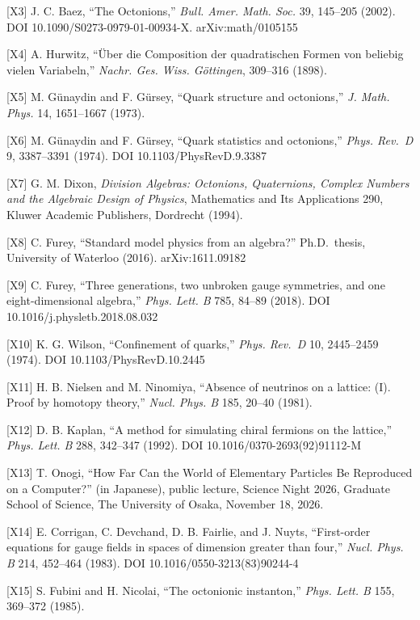 \documentclass[
  a4paper,
]{article}
\begin{document}
{[}X3{]} J. C. Baez, ``The Octonions,'' \emph{Bull. Amer. Math. Soc.}
39, 145--205 (2002). DOI 10.1090/S0273-0979-01-00934-X.
arXiv:math/0105155

{[}X4{]} A. Hurwitz, ``Über die Composition der quadratischen Formen von
beliebig vielen Variabeln,'' \emph{Nachr. Ges. Wiss. Göttingen},
309--316 (1898).

{[}X5{]} M. Günaydin and F. Gürsey, ``Quark structure and octonions,''
\emph{J. Math. Phys.} 14, 1651--1667 (1973).

{[}X6{]} M. Günaydin and F. Gürsey, ``Quark statistics and octonions,''
\emph{Phys. Rev.~D} 9, 3387--3391 (1974). DOI 10.1103/PhysRevD.9.3387

{[}X7{]} G. M. Dixon, \emph{Division Algebras: Octonions, Quaternions,
Complex Numbers and the Algebraic Design of Physics}, Mathematics and
Its Applications 290, Kluwer Academic Publishers, Dordrecht (1994).

{[}X8{]} C. Furey, ``Standard model physics from an algebra?''
Ph.D.~thesis, University of Waterloo (2016). arXiv:1611.09182

{[}X9{]} C. Furey, ``Three generations, two unbroken gauge symmetries,
and one eight-dimensional algebra,'' \emph{Phys. Lett. B} 785, 84--89
(2018). DOI 10.1016/j.physletb.2018.08.032

{[}X10{]} K. G. Wilson, ``Confinement of quarks,'' \emph{Phys. Rev.~D}
10, 2445--2459 (1974). DOI 10.1103/PhysRevD.10.2445

{[}X11{]} H. B. Nielsen and M. Ninomiya, ``Absence of neutrinos on a
lattice: (I). Proof by homotopy theory,'' \emph{Nucl. Phys. B} 185,
20--40 (1981).

{[}X12{]} D. B. Kaplan, ``A method for simulating chiral fermions on the
lattice,'' \emph{Phys. Lett. B} 288, 342--347 (1992). DOI
10.1016/0370-2693(92)91112-M

{[}X13{]} T. Onogi, ``How Far Can the World of Elementary Particles Be
Reproduced on a Computer?'' (in Japanese), public lecture, Science Night
2026, Graduate School of Science, The University of Osaka, November 18,
2026.

{[}X14{]} E. Corrigan, C. Devchand, D. B. Fairlie, and J. Nuyts,
``First-order equations for gauge fields in spaces of dimension greater
than four,'' \emph{Nucl. Phys. B} 214, 452--464 (1983). DOI
10.1016/0550-3213(83)90244-4

{[}X15{]} S. Fubini and H. Nicolai, ``The octonionic instanton,''
\emph{Phys. Lett. B} 155, 369--372 (1985).
\end{document}
